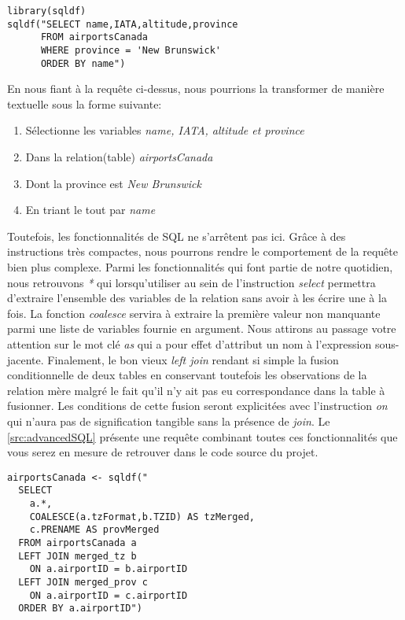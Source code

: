 \begin{lstlisting}[caption = Exemple de requête SQL,label=src:simpleSQL]
library(sqldf)
sqldf("SELECT name,IATA,altitude,province
      FROM airportsCanada
      WHERE province = 'New Brunswick'
      ORDER BY name")
\end{lstlisting}

\vspace{\baselineskip}
En nous fiant à la requête ci-dessus, nous pourrions la transformer de manière textuelle sous la forme suivante:
\begin{enumerate}
	\item Sélectionne les variables \emph{name, IATA, altitude et province}
	\item Dans la relation(table) \emph{airportsCanada}
	\item Dont la province est \emph{New Brunswick}
	\item En triant le tout par \emph{name}
\end{enumerate}

Toutefois, les fonctionnalités de SQL ne s'arrêtent pas ici. Grâce à des instructions très compactes, nous pourrons rendre le comportement de la requête bien plus complexe. Parmi les fonctionnalités qui font partie de notre quotidien, nous retrouvons \emph{*} qui lorsqu'utiliser au sein de l'instruction \emph{select} permettra d'extraire l'ensemble des variables de la relation sans avoir à les écrire une à la fois. La fonction \emph{coalesce} servira à extraire la première valeur non manquante parmi une liste de variables fournie en argument. Nous attirons au passage votre attention sur le mot clé \emph{as} qui a pour effet d'attribut un nom à l'expression sous-jacente. Finalement, le bon vieux \emph{left join} rendant si simple la fusion conditionnelle de deux tables en conservant toutefois les observations de la relation mère malgré le fait qu'il n'y ait pas eu correspondance dans la table à fusionner. Les conditions de cette fusion seront explicitées avec l'instruction \emph{on} qui n'aura pas de signification tangible sans la présence de \emph{join}. Le \autoref{src:advancedSQL} présente une requête combinant toutes ces fonctionnalités que vous serez en mesure de retrouver dans le code source du projet.

\begin{lstlisting}[caption = Fonctionnalités avancées de SQL,label=src:advancedSQL]
airportsCanada <- sqldf("
  SELECT 
    a.*, 
    COALESCE(a.tzFormat,b.TZID) AS tzMerged,
    c.PRENAME AS provMerged
  FROM airportsCanada a 
  LEFT JOIN merged_tz b
  	ON a.airportID = b.airportID
  LEFT JOIN merged_prov c
  	ON a.airportID = c.airportID
  ORDER BY a.airportID")
\end{lstlisting}

